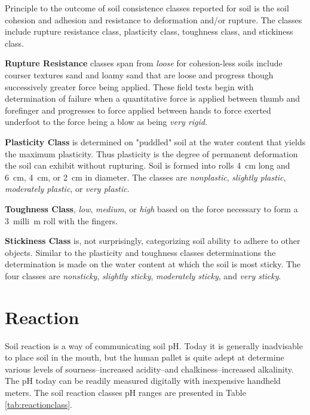 \documentclass{book}
\begin{document}
Principle to the outcome of soil consistence classes reported for soil is the soil cohesion and adhesion and resistance to deformation and/or rupture. The classes include rupture resistance class, plasticity class, toughness class, and stickiness class.

\textbf{Rupture Resistance} classes span from \textit{loose} for cohesion-less soils include courser textures sand and loamy sand that are loose and progress though successively greater force being applied. These field tests begin with determination of failure when a quantitative force is applied between thumb and forefinger and progresses to force applied between hands to force exerted underfoot to the force being a blow as being \textit{very rigid}.

\textbf{Plasticity Class} is determined on "puddled" soil at the water content that yields the maximum plasticity. Thus plasticity is the degree of permanent deformation the soil can exhibit without rupturing. Soil is formed into rolls \qty{4}{cm} long and \qty{6}{cm}, \qty{4}{cm}, or \qty{2}{cm} in diameter. The classes are \textit{nonplastic}, \textit{slightly plastic}, \textit{moderately plastic}, or \textit{very plastic}.

\textbf{Toughness Class}, \textit{low},  \textit{medium}, or \textit{high} based on the force necessary to form a \qty{3}{milli\metre} roll with the fingers.

 \textbf{Stickiness Class} is, not surprisingly, categorizing soil ability to adhere to other objects. Similar to the plasticity and toughness classes determinations the determination is made on the water content at which the soil is most sticky. The four classes are \textit{nonsticky}, \textit{slightly sticky}, \textit{moderately sticky}, and \textit{very sticky}.
 
 \section{Reaction}
\label{reaction}

Soil reaction is a way of communicating soil pH. Today it is generally inadvisable to place soil in the mouth, but the human pallet is quite adept at determine various levels of sourness–increased acidity–and chalkiness–increased alkalinity. The pH today can be readily measured digitally with inexpensive handheld meters. The soil reaction classes pH ranges are presented in Table \ref{tab:reactionclass}.
\end{document}
